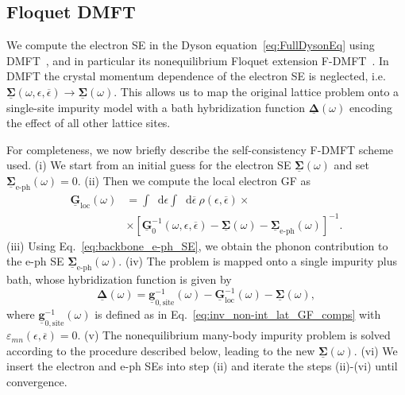 \documentclass[aps,prb,groupedaddress,showpacs,twocolumn,superscriptaddress,10pt]{revtex4-2}
\newcommand*\dd{\mathop{}\!\mathrm{d}}
\newcommand{\mat}[1]{\bm{#1}} %
\newcommand{\kel}[1]{\underline{#1}} %
\begin{document}
\subsection{Floquet DMFT}
\label{sec:FDMFT_implementation}

We compute the electron SE in the Dyson equation~\eqref{eq:FullDysonEq} using DMFT~\cite{me.vo.89,ge.ko.92,ge.ko.96}, and in particular its nonequilibrium Floquet extension F-DMFT~\cite{ts.ok.08,sc.mo.02u,jo.fr.08}. In DMFT the crystal momentum dependence of the electron SE is neglected, i.e. $\kel{\mat{\Sigma}}(\omega,\epsilon,\overline{\epsilon}) \to \kel{\mat{\Sigma}}(\omega)$. This allows us to map the original lattice problem onto a single-site impurity model with a bath hybridization function $\kel{\mat\Delta}(\omega)$ encoding the effect of all other lattice sites. 

For completeness, we now briefly describe the self-consistency F-DMFT scheme used. (i) We start from an initial guess for the electron SE $\kel{\mat{\Sigma}}(\omega)$ and set $\kel{\mat \Sigma}_{\text{e-ph}}(\omega)=0$. (ii) Then we compute the local electron GF as 
%  
\begin{equation}\label{eq:Lat_LocGF}
\begin{split}
\kel{\mat G}_{\text{loc}}(\omega) &= \int \dd\epsilon \int \dd\overline{\epsilon} \ \rho(\epsilon,\overline{\epsilon}) \times \\ 
&\times \left[\kel{\mat G}^{-1}_{0}(\omega,\epsilon,\overline{\epsilon}) - \kel{\mat\Sigma}(\omega) - \kel{\mat \Sigma}_{\text{e-ph}}(\omega) \right]^{-1}.
\end{split}
\end{equation}
% 
(iii) Using Eq.~\eqref{eq:backbone_e-ph_SE}, we obtain the phonon contribution to the e-ph SE $\kel{\mat{\Sigma}}_{\text{e-ph}}(\omega)$. (iv) The problem is mapped onto a single impurity plus bath, whose hybridization function is given by
%
\begin{equation}\label{eq:imp_Dyson_eq}
\kel{\mat{\Delta}}(\omega) = \kel{\mat{g}}^{-1}_{0,\text{site}}(\omega) - \kel{\mat{G}}^{-1}_{\text{loc}}(\omega) - \kel{\mat{\Sigma}}(\omega),
\end{equation}   
%  
where $\kel{\mat{g}}^{-1}_{0,\text{site}}(\omega)$ is defined as in Eq.~\eqref{eq:inv_non-int_lat_GF_comps} with $\varepsilon_{mn}(\epsilon,\overline{\epsilon})=0$. (v) The nonequilibrium many-body impurity problem is solved according to the procedure described below, leading to the new $\kel{\mat{\Sigma}}(\omega)$. (vi) We insert the electron and e-ph SEs into step (ii) and iterate the steps (ii)-(vi) until convergence.
\end{document}
